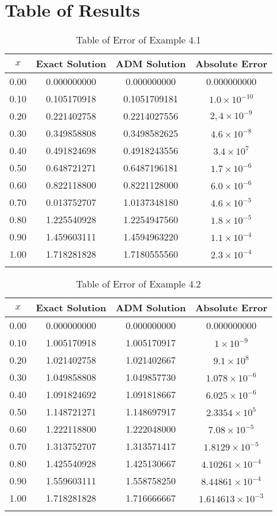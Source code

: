 \documentclass[11pt]{report}
\begin{document}
	\section{Table of Results}
		\begin{longtable}{|c|c|c|c|}
		\hline
		$x$ & Exact Solution & ADM Solution & Absolute Error\\\hline
		0.00 & 0.000000000 & 0.000000000 & 0.000000000\\
		0.10 & 0.105170918 & 0.1051709181 & $1.0\times 10^{-10}$\\
		0.20 & 0.221402758 & 0.2214027556 & $2,4\times 10^{-9}$\\
		0.30 & 0.349858808 & 0.3498582625 & $4.6\times 10^{-8}$\\
		0.40 & 0.491824698 & 0.4918243556 & $3.4\times 10^{7}$\\
		0.50 & 0.648721271 & 0.6487196181 & $1.7\times 10^{-6}$\\
		0.60 & 0.822118800 & 0.8221128000 & $6.0\times 10^{-6}$\\
		0.70 & 0.013752707 & 1.0137348180 & $4.6\times 10^{-5}$\\
		0.80 & 1.225540928 & 1.2254947560 & $1.8\times 10^{-5}$\\
		0.90 & 1.459603111 & 1.4594963220 & $1.1\times 10^{-4}$\\
		1.00 & 1.718281828 & 1.7180555560 & $2.3\times 10^{-4}$\\\hline
		\caption{Table of Error of Example 4.1}\label{tab:4_1}
	\end{longtable}
	\newpage
	\begin{longtable}{|c|c|c|c|}
		\hline
		$x$ & Exact Solution & ADM Solution & Absolute Error\\\hline
		0.00 & 0.000000000 & 0.000000000 & 0.000000000\\
		0.10 & 1.005170918 & 1.005170917 & $1\times10^{-9}$\\
		0.20 & 1.021402758 & 1.021402667 & $9.1\times10^{8}$\\
		0.30 & 1.049858808 & 1.049857730 & $1.078\times10^{-6}$\\
		0.40 & 1.091824692 & 1.091818667 & $6.025\times10^{-6}$\\
		0.50 & 1.148721271 & 1.148697917 & $2.3354\times10^{5}$\\
		0.60 & 1.222118800 & 1.222048000 & $7.08\times10^{-5}$\\
		0.70 & 1.313752707 & 1.313571417 & $1.8129\times10^{-5}$\\
		0.80 & 1.425540928 & 1.425130667 & $4.10261\times10^{-4}$\\
		0.90 & 1.559603111 & 1.558758250 & $8.44861\times10^{-4}$\\
		1.00 & 1.718281828 & 1.716666667 & $1.614613\times10^{-3}$\\\hline
		\caption{Table of Error of Example 4.2}\label{tab:4_2}
	\end{longtable}
\end{document}
